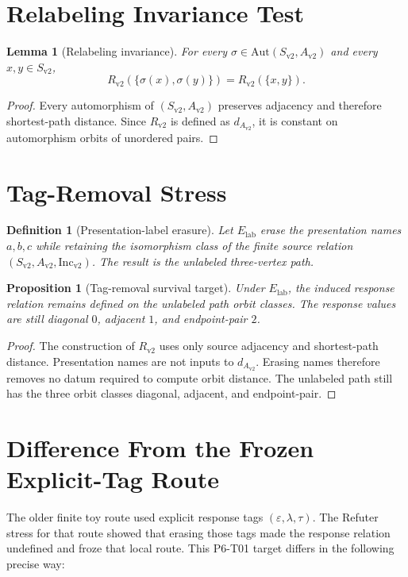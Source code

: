\documentclass[11pt]{article}
\newtheorem{definition}{Definition}
\newtheorem{lemma}{Lemma}
\newtheorem{proposition}{Proposition}
\newcommand{\Sv}{S_{\mathrm{v2}}}
\newcommand{\Av}{A_{\mathrm{v2}}}
\newcommand{\Incv}{\mathrm{Inc}_{\mathrm{v2}}}
\newcommand{\Aut}{\mathrm{Aut}}
\newcommand{\Rv}{R_{\mathrm{v2}}}
\begin{document}
\section{Relabeling Invariance Test}

\begin{lemma}[Relabeling invariance]
For every \(\sigma\in\Aut(\Sv,\Av)\) and every \(x,y\in\Sv\),
\[
  \Rv(\{\sigma(x),\sigma(y)\})=\Rv(\{x,y\}).
\]
\end{lemma}

\begin{proof}
Every automorphism of \((\Sv,\Av)\) preserves adjacency and therefore
shortest-path distance. Since \(\Rv\) is defined as \(d_{\Av}\), it is
constant on automorphism orbits of unordered pairs.
\end{proof}

\section{Tag-Removal Stress}

\begin{definition}[Presentation-label erasure]
Let \(E_{\mathrm{lab}}\) erase the presentation names \(a,b,c\) while
retaining the isomorphism class of the finite source relation
\((\Sv,\Av,\Incv)\). The result is the unlabeled three-vertex path.
\end{definition}

\begin{proposition}[Tag-removal survival target]
Under \(E_{\mathrm{lab}}\), the induced response relation remains defined on
the unlabeled path orbit classes. The response values are still
diagonal \(0\), adjacent \(1\), and endpoint-pair \(2\).
\end{proposition}

\begin{proof}
The construction of \(\Rv\) uses only source adjacency and shortest-path
distance. Presentation names are not inputs to \(d_{\Av}\). Erasing names
therefore removes no datum required to compute orbit distance. The unlabeled
path still has the three orbit classes diagonal, adjacent, and endpoint-pair.
\end{proof}

\section{Difference From the Frozen Explicit-Tag Route}

The older finite toy route used explicit response tags
\((\varepsilon,\lambda,\tau)\). The Refuter stress for that route showed that
erasing those tags made the response relation undefined and froze that local
route. This P6-T01 target differs in the following precise way:
\end{document}
